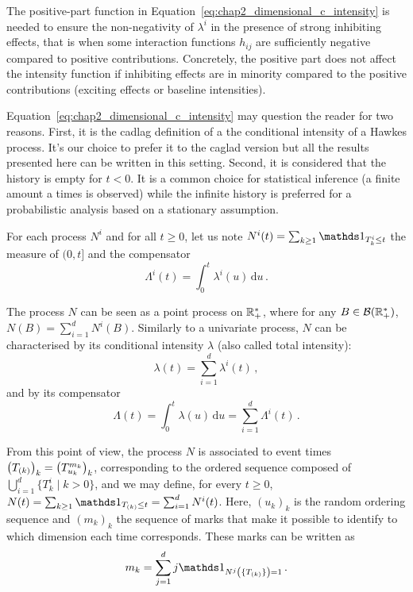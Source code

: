     \begin{remark}
      The positive-part function in Equation~\eqref{eq:chap2_dimensional_c_intensity} is needed to ensure the non-negativity of \(\lambda^i\) in the presence of strong inhibiting effects, that is when some interaction functions \(h_{ij}\) are sufficiently negative compared to positive contributions.
      Concretely, the positive part does not affect the intensity function if inhibiting effects are in minority compared to the positive contributions (exciting effects or baseline intensities).
    \end{remark}
    \begin{remark}
        Equation~\eqref{eq:chap2_dimensional_c_intensity} may question the reader for two reasons.
        First, it is the cadlag definition of a the conditional intensity of a Hawkes process.
        It's our choice to prefer it to the caglad version but all the results presented here can be written in this setting.
        Second, it is considered that the history is empty for \(t < 0\).
        It is a common choice for statistical inference (a finite amount a times is observed) while the infinite history is preferred for a probabilistic analysis based on a stationary assumption.
    \end{remark}
    
    
    For each process \(N^i\) and for all $t\geq 0$, let us note $N^i(t) = \sum_{k\geq 1}{\II_{T_k^i \leq t}}$ the measure of \((0, t]\) and the compensator \[\Lambda^i(t) = \int_{0}^{t}{\lambda^i(u)\,\mathrm{d}u}\,.\]

    The process $N$ can be seen as a point process on ${\mathbb R}_+^*$, where for any $B\in\mathcal{B}({\mathbb R}^*_+)$, $N(B) = \sum_{i=1}^{d}{N^i(B)}$.
    Similarly to a univariate process, \(N\) can be characterised by its conditional intensity \(\lambda\) (also called total intensity):
    \begin{equation}\label{eq:chap2_total_intensity}
        \lambda(t) = \sum_{i=1}^{d}{\lambda^i(t)}\,,
    \end{equation}
    and by its compensator
    \[\Lambda(t)=\int_{0}^{t}{\lambda(u)\,\mathrm{d}u} =\sum_{i=1}^{d}{\Lambda^i(t)}\,.\]

    From this point of view, the process \(N\) is associated to event times $\left(T_{(k)}\right)_k = \left(T_{u_k}^{m_k}\right)_k$, corresponding to the ordered sequence composed of $\bigcup_{i=1}^{d}\{T_k^i \mid k>0\}$,
    and we may define, for every \(t\ge 0\), $N(t) = \sum_{k\geq 1}{\II_{T\park \leq t}} = \sum_{i=1}^{d}{N^i(t)}$.
    Here, $(u_k)_k$ is the random ordering sequence and $(m_k)_k$ the sequence of marks that make it possible to identify to which dimension each time corresponds.
    These marks can be written as \[m_k = \sum_{j=1}^{d}{j\II_{N^j\left(\{T\park\}\right) = 1}}\,.\]
    
